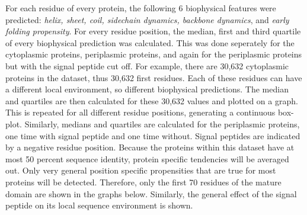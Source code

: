 
For each residue of every protein, 
the following 6 biophysical features were predicted:
\textit{
helix,
sheet,
coil,
sidechain dynamics,
backbone dynamics},
and
\textit{early folding propensity}.
For every residue position,
the median, first and third quartile of every biophysical prediction was calculated.
This was done seperately for the cytoplasmic proteins,
periplasmic proteins,
and again for the periplasmic proteins but with the signal peptide cut off.
For example,
there are 30,632 cytoplasmic proteins in the dataset, thus 30,632 first residues. 
Each of these residues can have a different local environment, so different biophysical predictions.
The median and quartiles are then calculated for these 30,632 values and plotted on a graph.
This is repeated for all different residue positions, generating a continuous box-plot.
Similarly, medians and quartiles are calculated for the periplasmic proteins, one time with signal peptide and one time without.
Signal peptides are indicated by a negative residue position.
Because the proteins within this dataset have at most 50 percent sequence identity, 
protein specific tendencies will be averaged out.
Only very general position specific propensities that are true for most proteins will be detected.
Therefore, only the first 70 residues of the mature domain are shown in the graphs below.
Similarly, the general effect of the signal peptide on its local sequence environment is shown.
